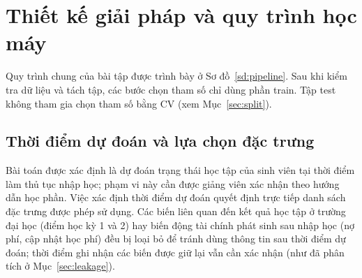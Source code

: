 \chapter{Thiết kế giải pháp và quy trình học máy}

Quy trình chung của bài tập được trình bày ở Sơ đồ~\ref{sd:pipeline}. Sau khi kiểm tra dữ liệu và tách tập, các bước chọn tham số chỉ dùng phần train. Tập test không tham gia chọn tham số bằng CV (xem Mục~\ref{sec:split}).

\begin{sodo}
\centering
{}
\caption{Quy trình xử lý và đánh giá của nhóm}\label{sd:pipeline}
\end{sodo}

\section{Thời điểm dự đoán và lựa chọn đặc trưng}
Bài toán được xác định là dự đoán trạng thái học tập của sinh viên tại thời điểm làm thủ tục nhập học; phạm vi này cần được giảng viên xác nhận theo hướng dẫn học phần. Việc xác định thời điểm dự đoán quyết định trực tiếp danh sách đặc trưng được phép sử dụng. Các biến liên quan đến kết quả học tập ở trường đại học (điểm học kỳ 1 và 2) hay biến động tài chính phát sinh sau nhập học (nợ phí, cập nhật học phí) đều bị loại bỏ để tránh dùng thông tin sau thời điểm dự đoán; thời điểm ghi nhận các biến được giữ lại vẫn cần xác nhận (như đã phân tích ở Mục~\ref{sec:leakage}).

